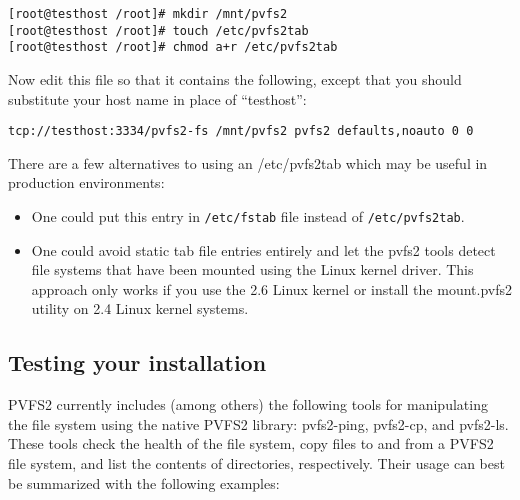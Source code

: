 \documentclass[11pt, letterpaper]{article}
\begin{document}
\begin{verbatim}
[root@testhost /root]# mkdir /mnt/pvfs2
[root@testhost /root]# touch /etc/pvfs2tab
[root@testhost /root]# chmod a+r /etc/pvfs2tab
\end{verbatim}

Now edit this file so that it contains the following, except that you should
substitute your host name in place of ``testhost'':

\begin{verbatim}
tcp://testhost:3334/pvfs2-fs /mnt/pvfs2 pvfs2 defaults,noauto 0 0 
\end{verbatim}

There are a few alternatives to using an /etc/pvfs2tab which may be useful
in production environments:
\begin{itemize}
\item One could put this entry in \texttt{/etc/fstab} file instead of
\texttt{/etc/pvfs2tab}. 
\item One could avoid static tab file entries entirely and let the pvfs2 tools
detect file systems that have been mounted using the Linux kernel
driver.  This approach only works if you use the 2.6 Linux kernel or
install the mount.pvfs2 utility on 2.4 Linux kernel systems.
\end{itemize}

\subsection{Testing your installation}
\label{subsec:testing}
PVFS2 currently includes (among others) the following tools for
manipulating the file system using the native PVFS2 library:
pvfs2-ping, pvfs2-cp, and pvfs2-ls.  These tools
check the health of the file system, copy files to and from a PVFS2 file system, and list the
contents of directories, respectively.  Their usage
can best be summarized with the following examples:
\end{document}
